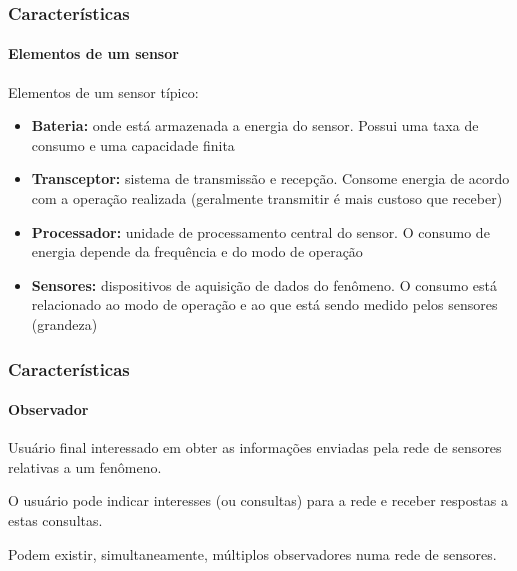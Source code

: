 \documentclass[notes]{beamer}
\begin{document}
\begin{frame}
\label{slide_12}
\frametitle{Características}
\framesubtitle{Elementos de um sensor}

\begin{block}

Elementos de um sensor típico: \pause

\begin{itemize}

\item \textbf{Bateria:} onde está armazenada a energia do sensor. Possui uma taxa de consumo e uma capacidade finita \pause

\item \textbf{Transceptor:} sistema de transmissão e recepção. Consome energia de acordo com a operação realizada (geralmente transmitir é mais custoso que receber) \pause

\item \textbf{Processador:} unidade de processamento central do sensor. O consumo de energia depende da frequência e do modo de operação \pause

\item \textbf{Sensores:} dispositivos de aquisição de dados do fenômeno. O consumo está relacionado ao modo de operação e ao que está sendo medido pelos sensores (grandeza) 

\end{itemize}

\end{block}

\end{frame}

\begin{frame}
\label{slide_13}
\frametitle{Características}
\framesubtitle{Observador}

\begin{block}

Usuário final interessado em obter as informações enviadas pela rede de sensores relativas a um fenômeno. 
\end{block}

\begin{block}

O usuário pode indicar interesses (ou consultas) para a rede e receber respostas a estas consultas. 
\end{block}

\begin{block}

Podem existir, simultaneamente, múltiplos observadores numa rede de sensores.
\end{block}

\end{frame}
\end{document}
